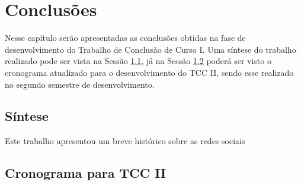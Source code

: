 \chapter{Conclusões}
\label{cap:conclusoes}
Nesse capítulo serão apresentadas as conclusões obtidas na fase de desenvolvimento do Trabalho de Conclusão de Curso I. Uma síntese do trabalho realizado pode ser vista na Sessão \ref{sec:sintese}, já na Sessão \ref{sec:cronograma} poderá ser visto o cronograma atualizado para o desenvolvimento do TCC II, sendo esse realizado no segundo semestre de desenvolvimento.

\section{Síntese}
\label{sec:sintese}
Este trabalho apresentou um breve histórico sobre as redes sociais

\section{Cronograma para TCC II}
\label{sec:cronograma}